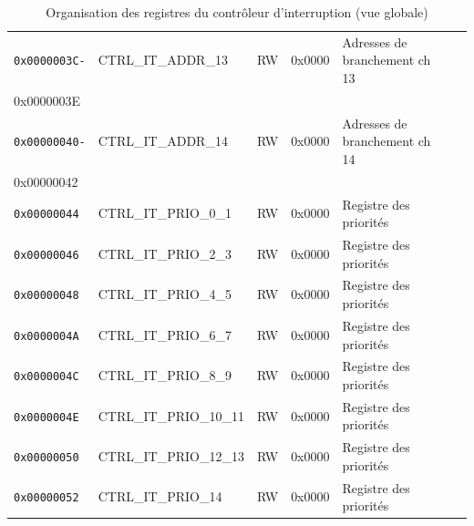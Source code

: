 \begin{table}[H]
\begin{tabular}{llllll}
		\rhline
		\texttt{0x0000003C-} & CTRL\_IT\_ADDR\_13     & RW            & 0x0000         & Adresses de branchement ch 13        \\
		{0x0000003E}         &                        &               &                &                                      \\
		\rhline
		\texttt{0x00000040-} & CTRL\_IT\_ADDR\_14     & RW            & 0x0000         & Adresses de branchement ch 14        \\
		{0x00000042}         &                        &               &                &                                      \\
		\rhline
		\texttt{0x00000044}  & CTRL\_IT\_PRIO\_0\_1   & RW            & 0x0000         & Registre des priorités               \\
		\rhline
		\texttt{0x00000046}  & CTRL\_IT\_PRIO\_2\_3   & RW            & 0x0000         & Registre des priorités               \\
		\rhline
		\texttt{0x00000048}  & CTRL\_IT\_PRIO\_4\_5   & RW            & 0x0000         & Registre des priorités               \\
		\rhline
		\texttt{0x0000004A}  & CTRL\_IT\_PRIO\_6\_7   & RW            & 0x0000         & Registre des priorités               \\
		\rhline
		\texttt{0x0000004C}  & CTRL\_IT\_PRIO\_8\_9   & RW            & 0x0000         & Registre des priorités               \\
		\rhline
		\texttt{0x0000004E}  & CTRL\_IT\_PRIO\_10\_11 & RW            & 0x0000         & Registre des priorités               \\
		\rhline
		\texttt{0x00000050}  & CTRL\_IT\_PRIO\_12\_13 & RW            & 0x0000         & Registre des priorités               \\
		\rhline
		\texttt{0x00000052}  & CTRL\_IT\_PRIO\_14     & RW            & 0x0000         & Registre des priorités               \\
		\hline
	\end{tabular}
	\caption{Organisation des registres du contrôleur d'interruption (vue globale)}
	\label{tab:reg_map}
\end{table}


